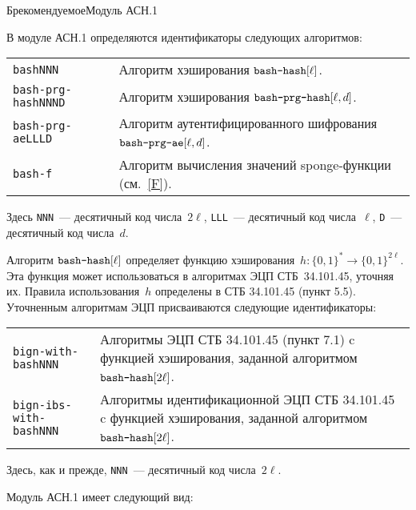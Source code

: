 \begin{appendix}{Б}{рекомендуемое}{Модуль АСН.1}
\label{ASN}

\mbox{}

В модуле АСН.1 определяются идентификаторы следующих алгоритмов:
\begin{center}
\begin{tabular}{p{3.6cm}p{12.7cm}}
\texttt{bashNNN} &
Алгоритм хэширования $\texttt{bash-hash}[\ell]$.\\
%
\texttt{bash-prg-hashNNND} &
Алгоритм хэширования $\texttt{bash-prg-hash}[\ell,d]$.\\
%
\texttt{bash-prg-aeLLLD} &
Алгоритм аутентифицированного шифрования $\texttt{bash-prg-ae}[\ell,d]$.\\
%
\texttt{bash-f}  &
Алгоритм вычисления значений sponge-функции (см.~\ref{F}).\\
\end{tabular}
\end{center}

Здесь \texttt{NNN}~--- десятичный код числа~$2\ell$, 
\texttt{LLL}~--- десятичный код числа~$\ell$, 
\texttt{D}~--- десятичный код числа~$d$.

Алгоритм $\texttt{bash-hash}[\ell]$ определяет функцию 
хэширования~$h\colon \{0,1\}^*\to\{0,1\}^{2\ell}$. 
Эта функция может использоваться в алгоритмах 
ЭЦП СТБ~34.101.45, уточняя их.
%
Правила использования~$h$ определены в СТБ 34.101.45 (пункт 5.5).
%
Уточненным алгоритмам ЭЦП присваиваются следующие идентификаторы:
\begin{center}
\begin{tabular}{p{4.4cm}p{12.0cm}}
\texttt{bign-with-bashNNN} &
Алгоритмы ЭЦП СТБ 34.101.45 (пункт 7.1)
c функцией хэширования, заданной алгоритмом~$\texttt{bash-hash}[2\ell]$.\\
%
\texttt{bign-ibs-with-bashNNN} &
Алгоритмы идентификационной ЭЦП СТБ 34.101.45
c функцией хэширования, заданной алгоритмом~$\texttt{bash-hash}[2\ell]$.\\
\end{tabular}
\end{center}

Здесь, как и прежде, \texttt{NNN}~--- десятичный код числа~$2\ell$.

Модуль АСН.1 имеет следующий вид:



\end{appendix}

